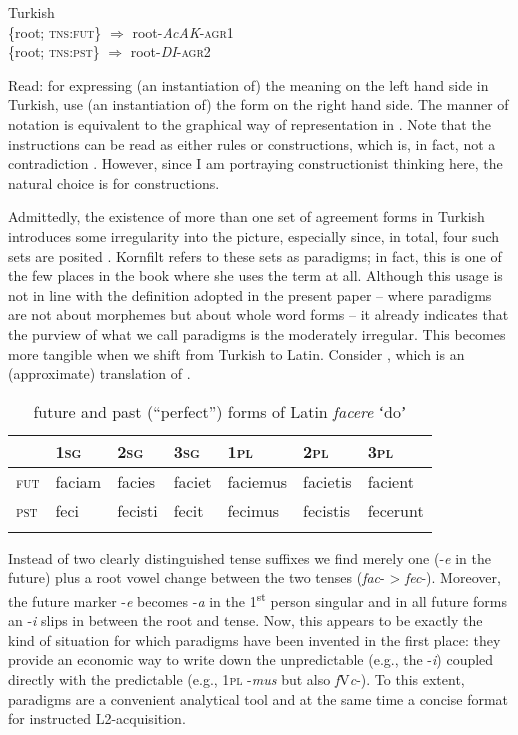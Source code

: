 \documentclass[output=paper]{langsci/langscibook}
\begin{document}
\ea \label{ex:reiner:2}
 {Turkish}\\
    \ea 
    \{root; \textsc{tns}:\textsc{fut}\} ${\Rightarrow}$ root-\textit{AcAK}{}-\textsc{agr}1 \\
    \ex \{root; \textsc{tns}:\textsc{pst}\} ${\Rightarrow}$ root-\textit{DI}{}-\textsc{agr}2
\z \z

Read: for expressing (an instantiation of) the meaning on the left hand side in Turkish, use (an instantiation of) the form on the right hand side. The manner of notation is equivalent to the graphical way of representation in . Note that the instructions can be read as either rules or constructions, which is, in fact, not a contradiction \citep[123--124]{Rostila2011}. However, since I am portraying constructionist thinking here, the natural choice is for constructions.

Admittedly, the existence of more than one set of agreement forms in Turkish introduces some irregularity into the picture, especially since, in total, four such sets are posited \citep[382]{Kornfilt1997}. Kornfilt refers to these sets as paradigms; in fact, this is one of the few places in the book where she uses the term at all. Although this usage is not in line with the definition adopted in the present paper – where paradigms are not about morphemes but about whole word forms – it already indicates that the purview of what we call paradigms is the moderately irregular. This becomes more tangible when we shift from Turkish to Latin. Consider , which is an (approximate) translation of .

\begin{table}
\caption{future and past (“perfect”) forms of Latin \textit{facere} ʻdoʼ \citep[Ch. 7]{Panhuis2009}\label{tab:reiner:3}}
\begin{tabular}{lllllll}
\lsptoprule
& {\textsc{1sg}} & {\textsc{2sg}} & {\textsc{3sg}} & {\textsc{1pl}} & {\textsc{2pl}} & {\textsc{3pl}}\\
\midrule
{\textsc{fut}} & faciam & facies & faciet & faciemus & facietis & facient\\
{\textsc{pst}} & feci & fecisti & fecit & fecimus & fecistis & fecerunt\\
\lspbottomrule
\end{tabular}
\end{table}

Instead of two clearly distinguished tense suffixes we find merely one (-\textit{e} in the future) plus a root vowel change between the two tenses (\textit{fac}{}- > \textit{fec}{}-). Moreover, the future marker -\textit{e} becomes -\textit{a} in the 1\textsuperscript{st} person singular and in all future forms an -\textit{i} slips in between the root and tense. Now, this appears to be exactly the kind of situation for which paradigms have been invented in the first place: they provide an economic way to write down the unpredictable (e.g., the -\textit{i}) coupled directly with the predictable (e.g., 1\textsc{pl} -\textit{mus} but also \textit{f}V\textit{c}{}-). To this extent, paradigms are a convenient analytical tool and at the same time a concise format for instructed L2-acquisition.
\end{document}
